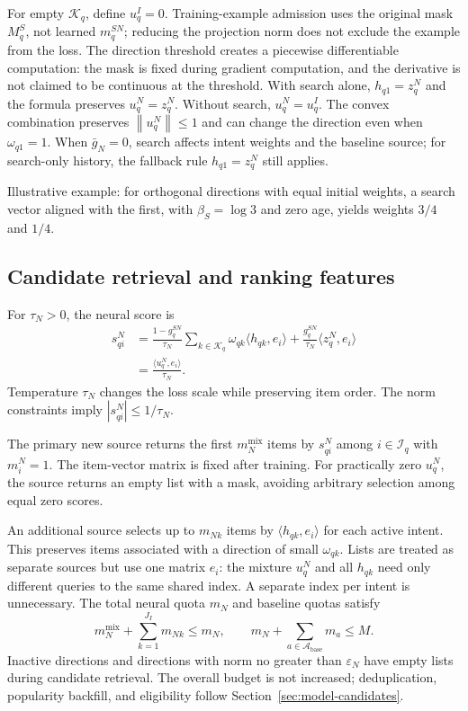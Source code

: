 \documentclass[12pt,a4paper]{article}
\newcommand{\eps}{\varepsilon}
\newcommand{\norm}[1]{\left\lVert#1\right\rVert}
\theoremstyle{plainru}
\begin{document}
For empty $\mathcal K_q$, define $u_q^I=0$.
Training-example admission uses the original mask $M_q^S$, not
learned $m_q^{SN}$; reducing the projection norm does not exclude the example
from the loss. The direction threshold creates a piecewise differentiable computation:
the mask is fixed during gradient computation, and the derivative
is not claimed to be continuous at the threshold.
With search alone, $h_{q1}=z_q^N$ and the formula preserves
$u_q^N=z_q^N$. Without search, $u_q^N=u_q^I$.
The convex combination preserves $\norm{u_q^N}\le1$ and can change
the direction even when $\omega_{q1}=1$. When $\bar g_N=0$, search affects
intent weights and the baseline source; for search-only history,
the fallback rule $h_{q1}=z_q^N$ still applies.

Illustrative example: for orthogonal directions with equal initial
weights, a search vector aligned with the first, with $\beta_S=\log 3$
and zero age, yields weights $3/4$ and $1/4$.

\subsection{Candidate retrieval and ranking features}
\label{sec:modern-retrieval}

For $\tau_N>0$, the neural score is
\begin{align}\label{eq:modern-score}
s_{qi}^{N}
&=\frac{1-g_q^{SN}}{\tau_N}
\sum_{k\in\mathcal K_q}\omega_{qk}\langle h_{qk},e_i\rangle
+\frac{g_q^{SN}}{\tau_N}\langle z_q^N,e_i\rangle\\
&=\frac{\langle u_q^N,e_i\rangle}{\tau_N}.
\nonumber
\end{align}
Temperature $\tau_N$ changes the loss scale while preserving item order.
The norm constraints imply $|s_{qi}^{N}|\le1/\tau_N$.

The primary new source returns the first $m_N^{\mathrm{mix}}$ items
by $s_{qi}^N$ among $i\in\mathcal I_q$ with $m_i^N=1$.
The item-vector matrix is fixed after training.
For practically zero $u_q^N$, the source returns an empty list
with a mask, avoiding arbitrary selection among equal zero scores.

An additional source selects up to $m_{Nk}$ items
by $\langle h_{qk},e_i\rangle$ for each active intent.
This preserves items associated with a direction of small $\omega_{qk}$.
Lists are treated as separate sources but use one matrix
$e_i$: the mixture $u_q^N$ and all $h_{qk}$ need only different queries
to the same shared index. A separate index per intent is unnecessary.
The total neural quota $m_N$ and baseline quotas satisfy
\begin{equation}\label{eq:modern-quota}
m_N^{\mathrm{mix}}+\sum_{k=1}^{J_I}m_{Nk}\le m_N,\qquad
m_N+\sum_{a\in\mathcal A_{\mathrm{base}}}m_a\le M.
\end{equation}
Inactive directions and directions with norm no greater than $\eps_N$
have empty lists during candidate retrieval.
The overall budget is not increased; deduplication, popularity
backfill, and eligibility follow Section~\ref{sec:model-candidates}.
\end{document}
